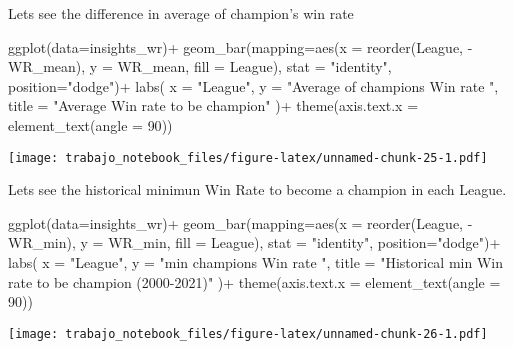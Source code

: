 \documentclass[
]{article}
\newenvironment{Shaded}{\begin{snugshade}}{\end{snugshade}}
\newcommand{\AttributeTok}[1]{\textcolor[rgb]{0.77,0.63,0.00}{#1}}
\newcommand{\DecValTok}[1]{\textcolor[rgb]{0.00,0.00,0.81}{#1}}
\newcommand{\FunctionTok}[1]{\textcolor[rgb]{0.00,0.00,0.00}{#1}}
\newcommand{\NormalTok}[1]{#1}
\newcommand{\SpecialCharTok}[1]{\textcolor[rgb]{0.00,0.00,0.00}{#1}}
\newcommand{\StringTok}[1]{\textcolor[rgb]{0.31,0.60,0.02}{#1}}
\begin{document}
Lets see the difference in average of champion's win rate

\begin{Shaded}
\begin{Highlighting}[]
\FunctionTok{ggplot}\NormalTok{(}\AttributeTok{data=}\NormalTok{insights\_wr)}\SpecialCharTok{+}
  \FunctionTok{geom\_bar}\NormalTok{(}\AttributeTok{mapping=}\FunctionTok{aes}\NormalTok{(}\AttributeTok{x =} \FunctionTok{reorder}\NormalTok{(League, }\SpecialCharTok{{-}}\NormalTok{WR\_mean), }\AttributeTok{y =}\NormalTok{ WR\_mean, }\AttributeTok{fill =}\NormalTok{ League), }\AttributeTok{stat =} \StringTok{"identity"}\NormalTok{, }\AttributeTok{position=}\StringTok{"dodge"}\NormalTok{)}\SpecialCharTok{+}
  \FunctionTok{labs}\NormalTok{(}
    \AttributeTok{x =} \StringTok{"League"}\NormalTok{,}
    \AttributeTok{y =} \StringTok{"Average of champion\textquotesingle{}s Win rate "}\NormalTok{,}
    \AttributeTok{title =} \StringTok{"Average Win rate to be champion"}
\NormalTok{  )}\SpecialCharTok{+}
  \FunctionTok{theme}\NormalTok{(}\AttributeTok{axis.text.x =} \FunctionTok{element\_text}\NormalTok{(}\AttributeTok{angle =} \DecValTok{90}\NormalTok{))  }
\end{Highlighting}
\end{Shaded}

\texttt{[image: trabajo\_notebook\_files/figure-latex/unnamed-chunk-25-1.pdf]}

Lets see the historical minimun Win Rate to become a champion in each
League.

\begin{Shaded}
\begin{Highlighting}[]
\FunctionTok{ggplot}\NormalTok{(}\AttributeTok{data=}\NormalTok{insights\_wr)}\SpecialCharTok{+}
  \FunctionTok{geom\_bar}\NormalTok{(}\AttributeTok{mapping=}\FunctionTok{aes}\NormalTok{(}\AttributeTok{x =} \FunctionTok{reorder}\NormalTok{(League, }\SpecialCharTok{{-}}\NormalTok{WR\_min), }\AttributeTok{y =}\NormalTok{ WR\_min, }\AttributeTok{fill =}\NormalTok{ League), }\AttributeTok{stat =} \StringTok{"identity"}\NormalTok{, }\AttributeTok{position=}\StringTok{"dodge"}\NormalTok{)}\SpecialCharTok{+}
  \FunctionTok{labs}\NormalTok{(}
    \AttributeTok{x =} \StringTok{"League"}\NormalTok{,}
    \AttributeTok{y =} \StringTok{"min champion\textquotesingle{}s Win rate "}\NormalTok{,}
    \AttributeTok{title =} \StringTok{"Historical min Win rate to be champion (2000{-}2021)"}
\NormalTok{  )}\SpecialCharTok{+}
  \FunctionTok{theme}\NormalTok{(}\AttributeTok{axis.text.x =} \FunctionTok{element\_text}\NormalTok{(}\AttributeTok{angle =} \DecValTok{90}\NormalTok{))}
\end{Highlighting}
\end{Shaded}

\texttt{[image: trabajo\_notebook\_files/figure-latex/unnamed-chunk-26-1.pdf]}
\end{document}

